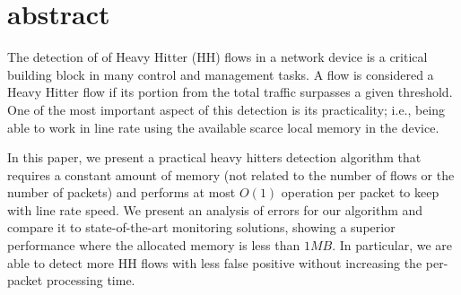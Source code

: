 \section{abstract}
The detection of of Heavy Hitter (HH) flows in a network device is a critical building block in many control and management tasks.  A flow is considered a Heavy Hitter flow if its portion from the total traffic surpasses a given threshold.  One of the most important aspect of this detection is its practicality; i.e., being able to work in line rate using the available scarce local memory in the device.  

In this paper, we present a practical heavy hitters detection algorithm that requires a constant amount of memory (not related to the number of flows or the number of packets) and performs at most $O(1)$ operation per packet to keep with line rate speed. We present an analysis of errors for our algorithm and compare it to state-of-the-art monitoring solutions, showing a superior performance where the allocated memory is less than $1MB$. In particular, we are able to detect more HH flows with less false positive without increasing the per-packet processing time.